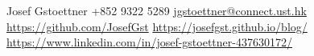 \documentclass[grey]{hipstercv}
\newlength{\rightcolwidth}
\begin{document}
\begin{paracol}{2}
\vfill{} %

\setlength{\parindent}{0pt}
\begin{minipage}[t]{\rightcolwidth}
\begin{center}\fontfamily{\sfdefault}\selectfont \color{black!70}
{\small Josef Gstoettner  +852 9322 5289  \protect\url{jgstoettner@connect.ust.hk} \\ 
 \protect\url{https://github.com/JosefGst}  \protect\url{https://josefgst.github.io/blog/} \\ 
 \protect\url{https://www.linkedin.com/in/josef-gstoettner-437630172/} 
}
\end{center}
\end{minipage}


\end{paracol}
\end{document}
